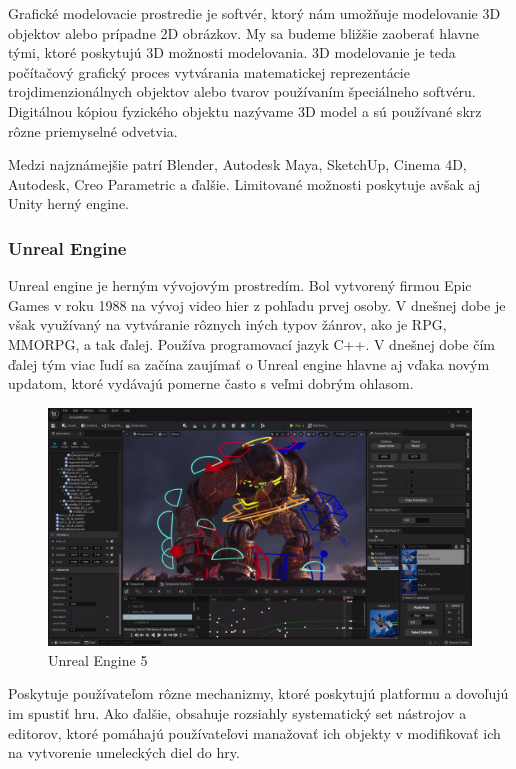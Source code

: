 Grafické modelovacie prostredie je softvér, ktorý nám umožňuje modelovanie 3D objektov alebo prípadne 2D obrázkov. My sa budeme bližšie zaoberať hlavne tými, ktoré poskytujú 3D možnosti modelovania. 3D modelovanie je teda počítačový grafický proces vytvárania matematickej reprezentácie trojdimenzionálnych objektov alebo tvarov používaním špeciálneho softvéru. Digitálnou kópiou fyzického objektu nazývame 3D model a sú používané skrz rôzne priemyselné odvetvia. 

Medzi najznámejšie patrí Blender, Autodesk Maya, SketchUp, Cinema 4D, Autodesk, Creo Parametric a ďalšie. Limitované možnosti poskytuje avšak aj Unity herný engine. \cite{autodesk2024modelingsoftware}

\subsubsection{Unreal Engine}

Unreal engine je herným vývojovým prostredím. Bol vytvorený firmou Epic Games v roku 1988 na vývoj video hier z pohľadu prvej osoby. V dnešnej dobe je však využívaný na vytváranie rôznych iných typov žánrov, ako je RPG, MMORPG, a tak ďalej. Používa programovací jazyk C++. V dnešnej dobe čím ďalej tým viac ľudí sa začína zaujímať o Unreal engine hlavne aj vďaka novým updatom, ktoré vydávajú pomerne často s veľmi dobrým ohlasom. 

\begin{figure}[h]
\centering
\includegraphics[width=1\textwidth]{img/unreal_engine_5.png}
\caption{Unreal Engine 5 \cite{unrealengine5}}
\label{fig:unrealengine5}
\end{figure}

Poskytuje používateľom rôzne mechanizmy, ktoré poskytujú platformu a dovoľujú im spustiť hru. Ako ďalšie, obsahuje rozsiahly systematický set nástrojov a editorov, ktoré pomáhajú používateľovi manažovať ich objekty v modifikovať ich na vytvorenie umeleckých diel do hry.

